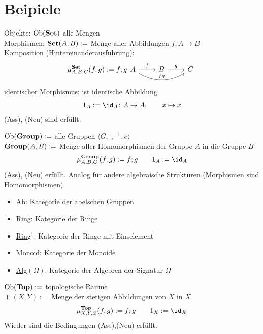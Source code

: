 \section*{Beipiele}
\begin{beispiel}%
	\label{def:set}
	Objekte: $\operatorname{Ob}(\operatorname{\mathbf{Set}})$ alle Mengen\\
	Morphismen: $\operatorname{\mathbf{Set}}(A,B):=$ Menge aller Abbildungen $f\colon A\to B$\\
	Komposition (Hintereinanderausführung):
	$$
		\mu_{A,B,C}^{\Set}(f,g):=f;g\\
		\begin{tikzcd}[ampersand replacement=\&]
			A \arrow{r}{f} \arrow[bend right]{rr}{fg} \& B \arrow{r}{g} \& C
	  	\end{tikzcd}
	$$
	identischer Morphismus: ist identische Abbildung
	\begin{align*}
		1_A:=\id_A\colon A\to A,\qquad x\mapsto x
	\end{align*}
	(Ass), (Neu) sind erfüllt.
\end{beispiel}


\begin{beispiel}
	\label{def:group}
	$\operatorname{Ob}(\operatorname{\mathbf{Group}}):=$ alle Gruppen $\langle G,\cdot,^{-1},e\rangle$\\
	$\operatorname{\mathbf{Group}}(A,B):=$ Menge aller Homomorphismen der Gruppe $A$ in die Gruppe $B$
	\begin{align*}
		\mu_{A,B,C}^{\Group}(f,g):=f;g\qquad 1_A:=\id_A
	\end{align*}
	(Ass), (Neu) erfüllt.\nl
	Analog für andere algebraische Strukturen (Morphismen sind Homomorphismen)
	\begin{itemize}
		\item \ul{Ab}: Kategorie der abelschen Gruppen
		\item \ul{Ring}: Kategorie der Ringe
		\item \ul{Ring$^1$}: Kategorie der Ringe mit Einselement
		\item \ul{Monoid}: Kategorie der Monoide
		\item \ul{Alg$(\Omega)$}: Kategorie der Algebren der Signatur $\Omega$
	\end{itemize}
\end{beispiel}

\begin{beispiel}[\ul{Top}]\label{beisp1.5Top}\enter
	$\operatorname{Ob}(\operatorname{\mathbf{Top}}):=$ topologische Räume\\
	$\Top(X,Y):=$ Menge der stetigen Abbildungen von $X$ in $X$
	\begin{align*}
		\mu_{X,Y,Z}^{\Top}(f,g):=f;g\qquad
		1_X:=\id_X
	\end{align*}
	Wieder sind die Bedingungen (Ass),(Neu) erfüllt.
\end{beispiel}


